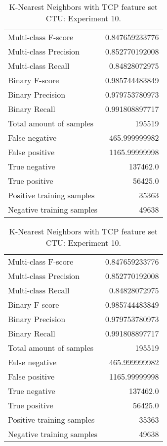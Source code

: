 \begin{table}[H]
\begin{minipage}{0.5\textwidth}
\caption{K-Nearest Neighbors with TCP feature set CTU: Experiment 9.}
\centering
\begin{tabular}{l r}
\toprule
Multi-class F-score & 0.847659233776 \\
Multi-class Precision & 0.852770192008 \\
Multi-class Recall & 0.84828072975 \\
\midrule
Binary F-score & 0.985744483849 \\
Binary Precision & 0.979753780973 \\
Binary Recall & 0.991808897717 \\
\midrule
Total amount of samples & 195519 \\
False negative & 465.999999982 \\
False positive & 1165.99999998 \\
True negative & 137462.0 \\
True positive & 56425.0 \\
\midrule
Positive training samples & 35363 \\
Negative training samples & 49638 \\
\bottomrule
\end{tabular}
\end{minipage}
\hfillx
\begin{minipage}{0.5\textwidth}
\caption{K-Nearest Neighbors with TCP feature set CTU: Experiment 10.}
\centering
\begin{tabular}{l r}
\toprule
Multi-class F-score & 0.847659233776 \\
Multi-class Precision & 0.852770192008 \\
Multi-class Recall & 0.84828072975 \\
\midrule
Binary F-score & 0.985744483849 \\
Binary Precision & 0.979753780973 \\
Binary Recall & 0.991808897717 \\
\midrule
Total amount of samples & 195519 \\
False negative & 465.999999982 \\
False positive & 1165.99999998 \\
True negative & 137462.0 \\
True positive & 56425.0 \\
\midrule
Positive training samples & 35363 \\
Negative training samples & 49638 \\
\bottomrule
\end{tabular}
\end{minipage}
\end{table}

